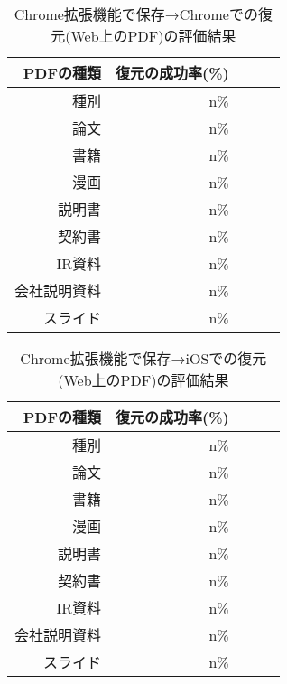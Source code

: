 \begin{table}[htbp]
  \caption{Chrome拡張機能で保存→Chromeでの復元(Web上のPDF)の評価結果}
  \label{tb:evl-result-pdf-chrome-to-chrome}
  \begin{center}
    \begin{tabular}{rrrrr}
      \hline
      PDFの種類  & 復元の成功率(\%) \\ \hline \hline
        種別 & n\%  \\ \hline
        論文 & n\% \\ \hline
        書籍 & n\% \\ \hline
        漫画 & n\% \\ \hline
        説明書 & n\% \\ \hline
        契約書 & n\% \\ \hline
        IR資料 & n\% \\ \hline
        会社説明資料 & n\% \\ \hline
        スライド & n\% \\ \hline
    \end{tabular}
  \end{center}
\end{table}

\begin{table}[htbp]
  \caption{Chrome拡張機能で保存→iOSでの復元(Web上のPDF)の評価結果}
  \label{tb:evl-result-pdf-chrome-to-ios}
  \begin{center}
    \begin{tabular}{rrrrr}
      \hline
      PDFの種類  & 復元の成功率(\%) \\ \hline \hline
        種別 & n\%  \\ \hline
        論文 & n\% \\ \hline
        書籍 & n\% \\ \hline
        漫画 & n\% \\ \hline
        説明書 & n\% \\ \hline
        契約書 & n\% \\ \hline
        IR資料 & n\% \\ \hline
        会社説明資料 & n\% \\ \hline
        スライド & n\% \\ \hline
    \end{tabular}
  \end{center}
\end{table}
